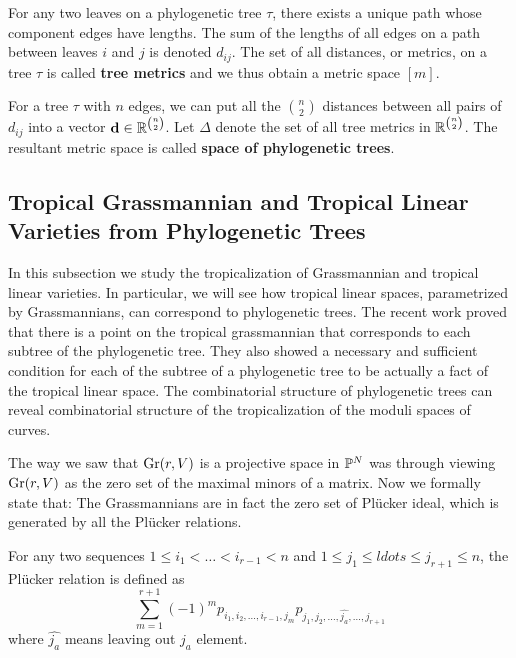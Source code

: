 		For any two leaves on a phylogenetic tree $\tau$,
		there exists a unique path 
		whose component edges have lengths.
		The sum of the lengths of all edges on a path between 
		leaves $i$ and $j$ is denoted  $d_{ij}$.
		The set of all distances, or metrics, on a tree $\tau$ 
		is called \textbf{tree metrics}
		and we thus obtain a metric space $[m]$. 
		
		For a tree $\tau$ with $n$ edges,
		we can put all the $\binom{n}{2}$ distances between 
		all pairs of $d_{ij}$ into a vector 
		$\mathbf{d} \in \R^{n \choose 2}$.
		Let $\Delta$ denote the set of all tree metrics in 
		$\R^{n \choose 2}$.
		The resultant metric space is called
		\textbf{space of phylogenetic trees}.
            
    \subsection{Tropical Grassmannian and Tropical Linear Varieties from Phylogenetic Trees}
        In this subsection we study the tropicalization of Grassmannian
        and tropical linear varieties. 
        In particular, we will see how tropical linear spaces, 
        parametrized by Grassmannians, can correspond to phylogenetic trees.
        The recent work \citet{Dukkipati2013} proved that 
        there is a point on the tropical grassmannian that corresponds to each subtree of the phylogenetic tree.
        They also showed a necessary and sufficient condition for
        each of the subtree of a phylogenetic tree to be actually a fact of the tropical linear space. 
        The combinatorial structure of phylogenetic trees can reveal combinatorial structure of the tropicalization of the moduli spaces of curves. 
        
        The way we saw that $\gr(r, V)$ is a projective space in $\P^N$ 
        was through viewing $\gr(r, V)$ as the zero set of the maximal minors of a matrix. 
        Now we formally state that: 
        The Grassmannians are in fact the zero set of Pl\"{u}cker ideal,
        which is generated by all the Pl\"{u}cker relations.
        
        \begin{definition}
        \label{def:plucker-relation}
            For any two sequences $1 \le i_1 < \ldots < i_{r-1} < n$
            and $1 \le j_1 \le ldots \le j_{r+1} \le n$,
            the Pl\"{u}cker relation is defined as 
            \[
            \sum\limits_{m=1}^{r+1} (-1)^m p_{i_1, i_2, \ldots, i_{r-1}, j_m} p_{j_1, j_2,\ldots, \hat{j_a}, \ldots, j_{r+1}}
            \] where $\hat{j_a}$ means leaving out $j_a$ element.
        \end{definition}
        
